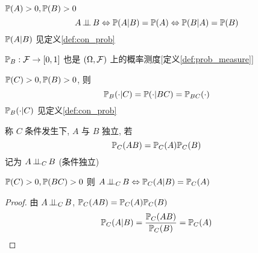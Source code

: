 \begin{theorem}
    $\mathbb{P}(A)>0,\mathbb{P}(B)>0$
    \[
    A\operatorname{\perp\!\!\!\perp} B\Leftrightarrow \mathbb{P}(A|B)=\mathbb{P}(A)\Leftrightarrow \mathbb{P}(B|A)=\mathbb{P}(B)
    \]
    $\mathbb{P}(A|B)$ 见定义\ref{def:con_prob}
\end{theorem}

\begin{theorem}
    $\mathbb{P}_B:\mathcal{F}\rightarrow [0,1]$ 也是 $(\Omega, \mathcal{F})$ 上的概率测度[定义\ref{def:prob_measure}]
\end{theorem}

\begin{property}
$\mathbb{P}(C)>0, \mathbb{P}(B)>0$, 则 
\[
\mathbb{P}_B(\cdot|C)=\mathbb{P}(\cdot |BC)=\mathbb{P}_{BC}(\cdot)
\]
$\mathbb{P}_B(\cdot|C)$ 见定义\ref{def:con_prob}
\end{property}

\begin{definition}
    称 $C$ 条件发生下, $A$ 与 $B$ 独立, 若
    \begin{equation}
		\mathbb{P}_C(AB)=\mathbb{P}_C(A)\mathbb{P}_C(B)
		\label{eq:con_indep}
		\end{equation}
    记为 $A\operatorname{\perp\!\!\!\perp}_C B$ (条件独立)
\end{definition}

\begin{theorem}
    $\mathbb{P}(C)>0, \mathbb{P}(BC)>0$ 则 $A\operatorname{\perp\!\!\!\perp}_C B \Leftrightarrow \mathbb{P}_C(A|B)=\mathbb{P}_C(A)$
\end{theorem}
\begin{proof}
由 $A\operatorname{\perp\!\!\!\perp}_C B$, $\mathbb{P}_C(AB)=\mathbb{P}_C(A)\mathbb{P}_C(B)$
\[
\mathbb{P}_C(A|B)=\frac{\mathbb{P}_C(AB)}{\mathbb{P}_C(B)}=\mathbb{P}_C(A)
\]
\end{proof}
\newpage